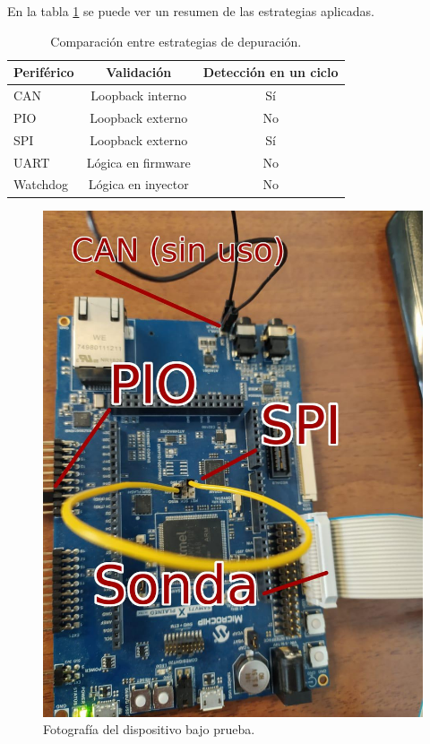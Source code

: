 En la tabla \ref{tab:perifericos} se puede ver un resumen de las estrategias aplicadas.

\begin{table}[h]
	\centering
	\caption[Estrategias de depuración]{Comparación entre estrategias de depuración.}

	\begin{tabular}{l c c}    
		\toprule
        \textbf{Periférico} & \textbf{Validación}       & \textbf{Detección en un ciclo}\\
		\midrule
		CAN                 & Loopback interno          & Sí\\		
		PIO                 & Loopback externo          & No\\
		SPI                 & Loopback externo          & Sí\\
		UART                & Lógica en firmware        & No\\
		Watchdog            & Lógica en inyector        & No\\
		\bottomrule
		\hline
	\end{tabular}
	\label{tab:perifericos}
\end{table}

\begin{figure}[htbp]
	\centering
	\includegraphics[width=\textwidth]{./Figures/labo.jpeg}
    \caption{Fotografía del dispositivo bajo prueba.}
	\label{fig:labo}
\end{figure}

